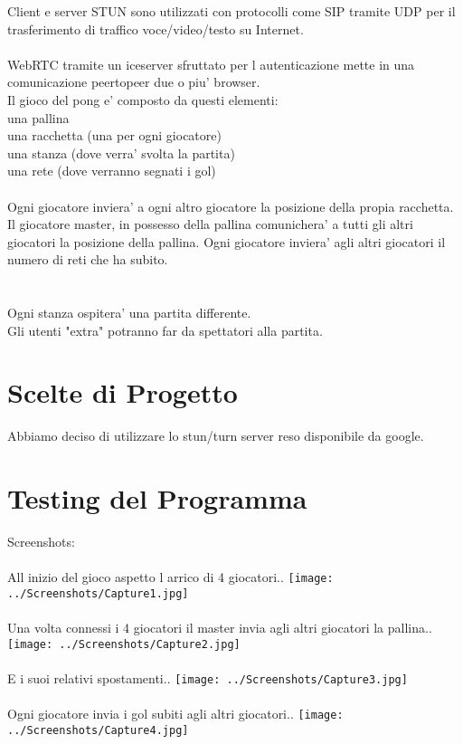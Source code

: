 ﻿\documentclass[11pt, a4paper, titlepage, block]{article}
\begin{document}
Client e server STUN sono utilizzati con protocolli come SIP tramite UDP per il trasferimento di traffico voce/video/testo su Internet.\\
\\

WebRTC tramite un iceserver sfruttato per l autenticazione mette in una comunicazione peertopeer due o piu' browser.\\
Il gioco del pong e' composto da questi elementi:\\
una pallina\\
una racchetta (una per ogni giocatore)\\
una stanza (dove verra' svolta la partita)\\
una rete (dove verranno segnati i gol)\\
\\
Ogni giocatore inviera' a ogni altro giocatore la posizione della propia racchetta.\\
Il giocatore master, in possesso della pallina comunichera' a tutti gli altri giocatori la posizione della pallina.
Ogni giocatore inviera' agli altri giocatori il numero di reti che ha subito.\\
\\
\\
Ogni stanza ospitera' una partita differente.\\
Gli utenti "extra" potranno far da spettatori alla partita.\\

\section{Scelte di Progetto}
	Abbiamo deciso di utilizzare lo stun/turn server reso disponibile da google.

\section{Testing del Programma}
	Screenshots:
\\
\\
All inizio del gioco aspetto l arrico di 4 giocatori..
\texttt{[image: ../Screenshots/Capture1.jpg]}
\\
\\
Una volta connessi i 4 giocatori il master invia agli altri giocatori la pallina..
\texttt{[image: ../Screenshots/Capture2.jpg]}
\\
\\
E i suoi relativi spostamenti..
\texttt{[image: ../Screenshots/Capture3.jpg]}
\\
\\
Ogni giocatore invia i gol subiti agli altri giocatori..
\texttt{[image: ../Screenshots/Capture4.jpg]}
	\\	
	\\
\end{document}
